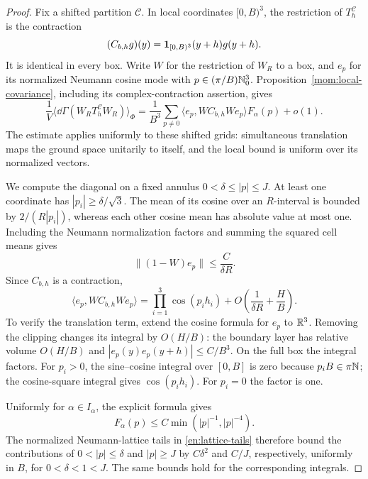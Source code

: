 \begin{proof}
Fix a shifted partition $\mathcal C$. In local coordinates $[0,B)^3$,
the restriction of $T_h^{\mathcal C}$ is the contraction
\[
 (C_{b,h}g)(y)=\mathbf 1_{[0,B)^3}(y+h)g(y+h).
\]
It is identical in every box. Write $W$ for the restriction of $W_R$
to a box, and $e_p$ for its normalized Neumann cosine mode with
$p\in(\pi/B)\mathbb N_0^3$. Proposition~\ref{mom:local-covariance}, including
its complex-contraction assertion, gives
\begin{equation}\label{mom:local-translation-trace}
 \frac1V\langle\dd\Gamma(W_RT_h^{\mathcal C}W_R)\rangle_\Phi
  =\frac1{B^3}\sum_{p\ne0}
        \langle e_p,WC_{b,h}We_p\rangle F_\alpha(p)+o(1).
\end{equation}
The estimate applies uniformly to these shifted grids: simultaneous
translation maps the ground space unitarily to itself, and the local
bound is uniform over its normalized vectors.

We compute the diagonal on a fixed annulus
$0<\delta\le|p|\le J$. At least one coordinate has
$|p_i|\ge\delta/\sqrt3$. The mean of its cosine over an $R$-interval
is bounded by $2/(R|p_i|)$, whereas each other cosine mean has absolute
value at most one. Including the Neumann normalization factors and
summing the squared cell means gives
\[
 \|(1-W)e_p\|\le\frac{C}{\delta R}.
\]
Since $C_{b,h}$ is a contraction,
\begin{equation}\label{mom:Neumann-diagonal}
 \langle e_p,WC_{b,h}We_p\rangle
   =\prod_{i=1}^3\cos(p_i h_i)
                  +O\left(\frac1{\delta R}+\frac HB\right).
\end{equation}
To verify the translation term, extend the cosine formula for $e_p$
to $\mathbb R^3$. Removing the clipping changes its integral by $O(H/B)$:
the boundary layer has relative volume $O(H/B)$ and
$|e_p(y)e_p(y+h)|\le C/B^3$. On the full box the integral factors.
For $p_i>0$, the sine--cosine integral over $[0,B]$ is zero because
$p_iB\in\pi\mathbb N$; the cosine-square integral gives $\cos(p_i h_i)$.
For $p_i=0$ the factor is one.

Uniformly for $\alpha\in I_\alpha$, the explicit formula gives
\begin{equation}\label{mom:profile-majorant}
 F_\alpha(p)\le C\min(|p|^{-1},|p|^{-4}).
\end{equation}
The normalized Neumann-lattice tails in \eqref{en:lattice-tails}
therefore bound the contributions of $0<|p|\le\delta$ and $|p|\ge J$
by $C\delta^2$ and $C/J$, respectively, uniformly in $B$, for
$0<\delta<1<J$. The same bounds hold for the corresponding integrals.


\end{proof}
